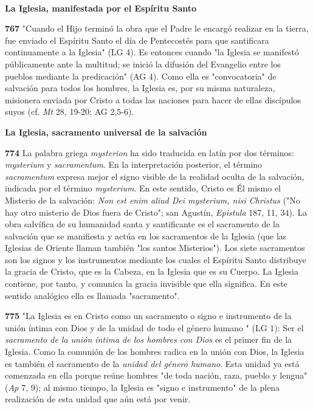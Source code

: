 \documentclass[]{article}
\begin{document}
\textbf{\\
}

\textbf{La Iglesia, manifestada por el Espíritu Santo}

\textbf{767} "Cuando el Hijo terminó la obra que el Padre le encargó
realizar en la tierra, fue enviado el Espíritu Santo el día de
Pentecostés para que santificara continuamente a la Iglesia" (LG 4). Es
entonces cuando "la Iglesia se manifestó públicamente ante la multitud;
se inició la difusión del Evangelio entre los pueblos mediante la
predicación" (AG 4). Como ella es "convocatoria" de salvación para todos
los hombres, la Iglesia es, por su misma naturaleza, misionera enviada
por Cristo a todas las naciones para hacer de ellas discípulos suyos
(cf. \emph{Mt} 28, 19-20; AG 2,5-6).

\textbf{La Iglesia, sacramento universal de la salvación}

\textbf{774} La palabra griega \emph{mysterion} ha sido traducida en
latín por dos términos: \emph{mysterium} y \emph{sacramentum}. En la
interpretación posterior, el término \emph{sacramentum} expresa mejor el
signo visible de la realidad oculta de la salvación, indicada por el
término \emph{mysterium}. En este sentido, Cristo es Él mismo el
Misterio de la salvación: \emph{Non est enim aliud Dei mysterium, nisi
Christus} ("No hay otro misterio de Dios fuera de Cristo"; san Agustín,
\emph{Epistula} 187, 11, 34). La obra salvífica de su humanidad santa y
santificante es el sacramento de la salvación que se manifiesta y actúa
en los sacramentos de la Iglesia (que las Iglesias de Oriente llaman
también "los santos Misterios"). Los siete sacramentos son los signos y
los instrumentos mediante los cuales el Espíritu Santo distribuye la
gracia de Cristo, que es la Cabeza, en la Iglesia que es su Cuerpo. La
Iglesia contiene, por tanto, y comunica la gracia invisible que ella
significa. En este sentido analógico ella es llamada "sacramento".

\textbf{775} "La Iglesia es en Cristo como un sacramento o signo e
instrumento de la unión íntima con Dios y de la unidad de todo el género
humano " (LG 1): Ser el \emph{sacramento de la unión íntima de los
hombres con Dios} es el primer fin de la Iglesia. Como la comunión de
los hombres radica en la unión con Dios, la Iglesia es también el
sacramento de la \emph{unidad del género humano}. Esta unidad ya está
comenzada en ella porque reúne hombres "de toda nación, raza, pueblo y
lengua" (\emph{Ap} 7, 9); al mismo tiempo, la Iglesia es "signo e
instrumento" de la plena realización de esta unidad que aún está por
venir.
\end{document}

